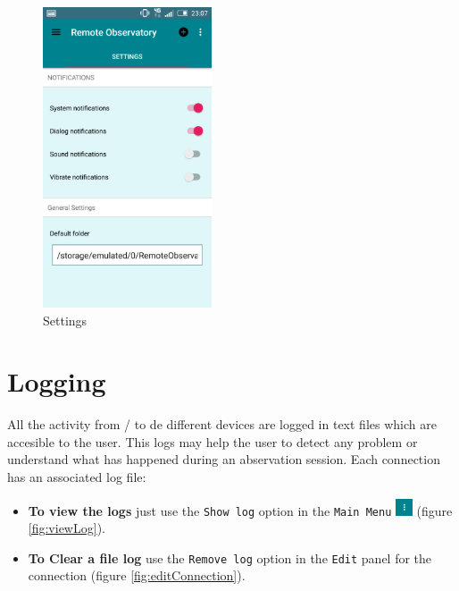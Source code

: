 \begin{figure}
 \centering
 \includegraphics[width=5cm]{../images/settings2.png}
 \caption{Settings}
 \label{fig:settings}
\end{figure}


   

\section{Logging}

All the activity from / to de different devices are logged in text files which are accesible to the user. This logs may help the user to detect any problem or understand what has happened during an abservation session. Each connection has an associated log file:

\begin{itemize}
  \item \textbf{To view the logs} just use the \texttt{Show log} option in the \texttt{Main Menu} \includegraphics[width=0.5cm]{../images/mainMenuButton.png} (figure \ref{fig:viewLog}).
  
  \item \textbf{To Clear a file log} use the \texttt{Remove log} option in the \texttt{Edit} panel for the connection (figure \ref{fig:editConnection}).
\end{itemize}


